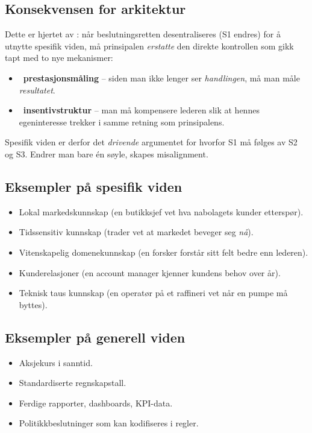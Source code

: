 \subsection*{Konsekvensen for arkitektur}

Dette er hjertet av : når beslutningsretten desentraliseres (S1 endres) for å utnytte spesifik viden, må prinsipalen \emph{erstatte} den direkte kontrollen som gikk tapt med to nye mekanismer:
\begin{itemize}
\item \STwo\ \textbf{prestasjonsmåling} -- siden man ikke lenger ser \emph{handlingen}, må man måle \emph{resultatet}.
\item \SThree\ \textbf{insentivstruktur} -- man må kompensere lederen slik at hennes egeninteresse trekker i samme retning som prinsipalens.
\end{itemize}
Spesifik viden er derfor det \emph{drivende} argumentet for hvorfor S1 må følges av S2 og S3. Endrer man bare én søyle, skapes misalignment.

\subsection*{Eksempler på spesifik viden}
\begin{itemize}
\item Lokal markedskunnskap (en butikksjef vet hva nabolagets kunder etterspør).
\item Tidssensitiv kunnskap (trader vet at markedet beveger seg \emph{nå}).
\item Vitenskapelig domenekunnskap (en forsker forstår sitt felt bedre enn lederen).
\item Kunderelasjoner (en account manager kjenner kundens behov over år).
\item Teknisk taus kunnskap (en operatør på et raffineri vet når en pumpe må byttes).
\end{itemize}

\subsection*{Eksempler på generell viden}
\begin{itemize}
\item Aksjekurs i sanntid.
\item Standardiserte regnskapstall.
\item Ferdige rapporter, dashboards, KPI-data.
\item Politikkbeslutninger som kan kodifiseres i regler.
\end{itemize}

